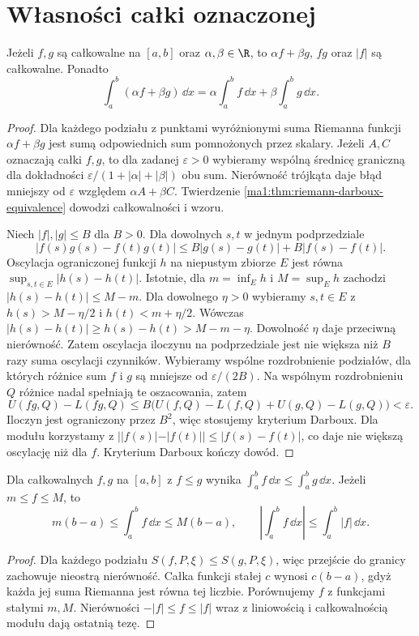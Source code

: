 \section{Własności całki oznaczonej}
\begin{twierdzenie}
\label{ma1:thm:riemann-algebra}
Jeżeli $f,g$ są całkowalne na $[a,b]$ oraz $\alpha,\beta\in\R$, to $\alpha f+\beta g$, $fg$ oraz $|f|$ są całkowalne. Ponadto
\[
 \int_a^b(\alpha f+\beta g)\,\dd x
 =\alpha\int_a^b f\,\dd x+\beta\int_a^b g\,\dd x.
\]
\end{twierdzenie}
\begin{proof}
Dla każdego podziału z punktami wyróżnionymi suma Riemanna funkcji $\alpha f+\beta g$ jest sumą odpowiednich sum pomnożonych przez skalary. Jeżeli $A,C$ oznaczają całki $f,g$, to dla zadanej $\varepsilon>0$ wybieramy wspólną średnicę graniczną dla dokładności $\varepsilon/(1+|\alpha|+|\beta|)$ obu sum. Nierówność trójkąta daje błąd mniejszy od $\varepsilon$ względem $\alpha A+\beta C$. Twierdzenie \ref{ma1:thm:riemann-darboux-equivalence} dowodzi całkowalności i wzoru.

Niech $|f|,|g|\le B$ dla $B>0$. Dla dowolnych $s,t$ w jednym podprzedziale
\[
 |f(s)g(s)-f(t)g(t)|\le B|g(s)-g(t)|+B|f(s)-f(t)|.
\]
Oscylacja ograniczonej funkcji $h$ na niepustym zbiorze $E$ jest równa $\sup_{s,t\in E}|h(s)-h(t)|$. Istotnie, dla $m=\inf_E h$ i $M=\sup_E h$ zachodzi $|h(s)-h(t)|\le M-m$. Dla dowolnego $\eta>0$ wybieramy $s,t\in E$ z $h(s)>M-\eta/2$ i $h(t)<m+\eta/2$. Wówczas $|h(s)-h(t)|\ge h(s)-h(t)>M-m-\eta$. Dowolność $\eta$ daje przeciwną nierówność. Zatem oscylacja iloczynu na podprzedziale jest nie większa niż $B$ razy suma oscylacji czynników. Wybieramy wspólne rozdrobnienie podziałów, dla których różnice sum $f$ i $g$ są mniejsze od $\varepsilon/(2B)$. Na wspólnym rozdrobnieniu $Q$ różnice nadal spełniają te oszacowania, zatem
\[
 U(fg,Q)-L(fg,Q)
 \le B\bigl(U(f,Q)-L(f,Q)+U(g,Q)-L(g,Q)\bigr)
 <\varepsilon.
\]
Iloczyn jest ograniczony przez $B^2$, więc stosujemy kryterium Darboux. Dla modułu korzystamy z $||f(s)|-|f(t)||\le |f(s)-f(t)|$, co daje nie większą oscylację niż dla $f$. Kryterium Darboux kończy dowód.
\end{proof}

\begin{twierdzenie}
\label{ma1:thm:riemann-order}
Dla całkowalnych $f,g$ na $[a,b]$ z $f\le g$ wynika $\int_a^b f\,\dd x\le\int_a^b g\,\dd x$. Jeżeli $m\le f\le M$, to
\[
 m(b-a)\le\int_a^b f\,\dd x\le M(b-a),\qquad
 \left|\int_a^b f\,\dd x\right|\le\int_a^b |f|\,\dd x.
\]
\end{twierdzenie}
\begin{proof}
Dla każdego podziału $S(f,P,\xi)\le S(g,P,\xi)$, więc przejście do granicy zachowuje nieostrą nierówność. Całka funkcji stałej $c$ wynosi $c(b-a)$, gdyż każda jej suma Riemanna jest równa tej liczbie. Porównujemy $f$ z funkcjami stałymi $m,M$. Nierówności $-|f|\le f\le |f|$ wraz z liniowością i całkowalnością modułu dają ostatnią tezę.
\end{proof}

